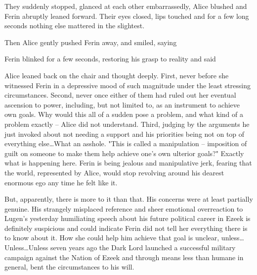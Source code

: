 They suddenly stopped, glanced at each other embarrassedly, Alice blushed and Ferin abruptly leaned forward. Their eyes closed, lips touched and for a few long seconds nothing else mattered in the slightest.

Then Alice gently pushed Ferin away, and smiled, saying 

Ferin blinked for a few seconds, restoring his grasp to reality and said 

Alice leaned back on the chair and thought deeply. First, never before she witnessed Ferin in a depressive mood of such magnitude under the least stressing circumstances. Second, never once either of them had ruled out her eventual ascension to power, including, but not limited to, as an instrument to achieve own goals. Why would this all of a sudden pose a problem, and what kind of a problem exactly -- Alice did not understand. Third, judging by the arguments he just invoked about not needing a support and his priorities being not on top of everything else\dots What an asshole. "This is called a manipulation -- imposition of guilt on someone to make them help achieve one's own ulterior goals?" Exactly what is happening here. Ferin is being jealous and manipulative jerk, fearing that the world, represented by Alice, would stop revolving around his dearest enormous ego any time he felt like it.

But, apparently, there is more to it than that. His concerns were at least partially genuine. His strangely misplaced reference and sheer emotional overreaction to Lugen's yesterday humiliating speech about his future political career in Ezeek is definitely suspicious and could indicate Ferin did not tell her everything there is to know about it. How she could help him achieve that goal is unclear, unless\dots Unless\dots Unless seven years ago the Dark Lord launched a successful military campaign against the Nation of Ezeek and through means less than humane in general, bent the circumstances to his will.

